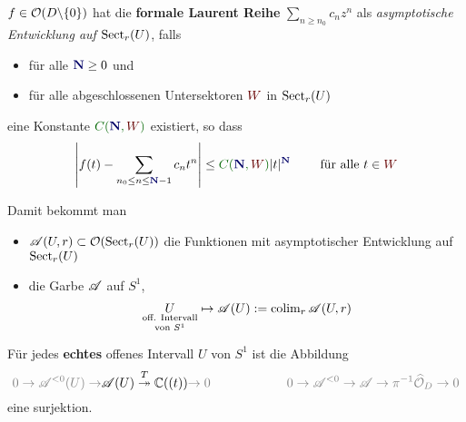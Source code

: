 \begin{defn}
  \def\myN{\textbf{\textcolor{blue!40!black}{N}}}
  \def\mySect{\textcolor{red!40!black}{W}}
  \def\myConst{\textcolor{green!40!black}{C(\myN,\mySect)}}
  $f\in\mathcal{O}(D\backslash\{0\})$ hat die \textbf{formale Laurent Reihe}
  $\sum_{n\geq n_0}c_nz^n$ als \emph{asymptotische Entwicklung auf
  $\operatorname{Sect}_r(U)$}, falls
  \begin{itemize}
    \item für alle $\myN\geq0$ und
    \item für alle abgeschlossenen Untersektoren $\mySect$ in $\operatorname{Sect}_r(U)$
  \end{itemize}
  eine Konstante $\myConst$ existiert, so dass
  \[
    \left|
      f(t)-\sum_{n_0\leq n\leq\myN-1}c_nt^n
    \right|
    \leq \myConst|t|^{\myN} \qquad \text{ für alle } t\in \mySect
  \]

  \begin{comment}
    oder äquivalent:
    $\lim_{z\to0,z\in{\mySect}}|t|^{-(\myN-1)}
      \left|
        f(t)-\sum_{n_0\leq n\leq \myN-1}c_nt^n
      \right|=0$
  \end{comment}
  Damit bekommt man
  \begin{itemize}
    \item $\mathscr{A}(U,r)\subset\mathcal{O}(\operatorname{Sect}_r(U))$ die Funktionen mit asymptotischer
      Entwicklung auf $\operatorname{Sect}_r(U)$
    \item die Garbe $\mathscr{A}$ auf $S^1$,
      \[
        \underset{\text{von } S^1}{\underset{\text{off. Intervall}}{U}}
        \mapsto\mathscr{A}(U):=\operatorname{colim}_r\mathscr{A}(U,r)
      \]
  \end{itemize}
  \TODO[Garbe auf $\tilde D=S^1\times[0,r)$ anstatt auf $S^1$]
\end{defn}
\begin{lem}
  Für jedes \textbf{echtes} offenes Intervall $U$ von $S^1$ ist die Abbildung
  \[
    \textcolor{gray}{0\to \sA^{<0}(U) \to}
    \sA(U) \overset{T}\twoheadrightarrow \C((t))
    \textcolor{gray}{\to0}
    \qquad
    \qquad
    \qquad
    \textcolor{gray}{0\to \sA^{<0} \to
    \sA \to \pi^{-1}\hat\cO_{D}
    \to0}
  \]
  eine surjektion.
\end{lem}
